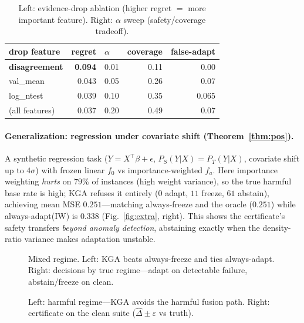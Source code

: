 \documentclass[conference]{IEEEtran}
\theoremstyle{plain}
\theoremstyle{definition}
\begin{document}
\begin{table}[t]\centering\small
\begin{tabular}{lr@{\hskip 2em}lrr}
\toprule
drop feature & regret & $\alpha$ & coverage & false-adapt\\
\midrule
\textbf{disagreement} & \textbf{0.094} & 0.01 & 0.11 & 0.00\\
val\_mean & 0.043 & 0.05 & 0.26 & 0.07\\
log\_ntest & 0.039 & 0.10 & 0.35 & 0.065\\
(all features) & 0.037 & 0.20 & 0.49 & 0.07\\
\bottomrule
\end{tabular}
\caption{Left: evidence-drop ablation (higher regret $=$ more important feature).
Right: $\alpha$ sweep (safety/coverage tradeoff).}
\label{tab:abl}
\end{table}

\paragraph{Generalization: regression under covariate shift (Theorem~\ref{thm:pos}).}
A synthetic regression task ($Y=X^\top\beta+\epsilon$, $P_S(Y|X)=P_T(Y|X)$, covariate
shift up to $4\sigma$) with frozen linear $f_0$ vs importance-weighted $f_a$. Here
importance weighting \emph{hurts} on $79\%$ of instances (high weight variance), so the
true harmful base rate is high; \textsc{KGA} refuses it entirely ($0$ adapt, $11$
freeze, $61$ abstain), achieving mean MSE $0.251$---matching always-freeze and the
oracle ($0.251$) while always-adapt(IW) is $0.338$ (Fig.~\ref{fig:extra}, right). This
shows the certificate's safety transfers \emph{beyond anomaly detection}, abstaining
exactly when the density-ratio variance makes adaptation unstable.

\begin{figure}[tb]\centering
{}\hfill
{}
\caption{Mixed regime. Left: \textsc{KGA} beats always-freeze and ties always-adapt.
Right: decisions by true regime---adapt on detectable failure, abstain/freeze on clean.}
\label{fig:mix}
\end{figure}
\begin{figure}[tb]\centering
{}\hfill
{}
\caption{Left: harmful regime---\textsc{KGA} avoids the harmful fusion path.
Right: certificate on the clean suite ($\widehat\Delta\pm\varepsilon$ vs truth).}
\label{fig:harm}
\end{figure}
\end{document}
